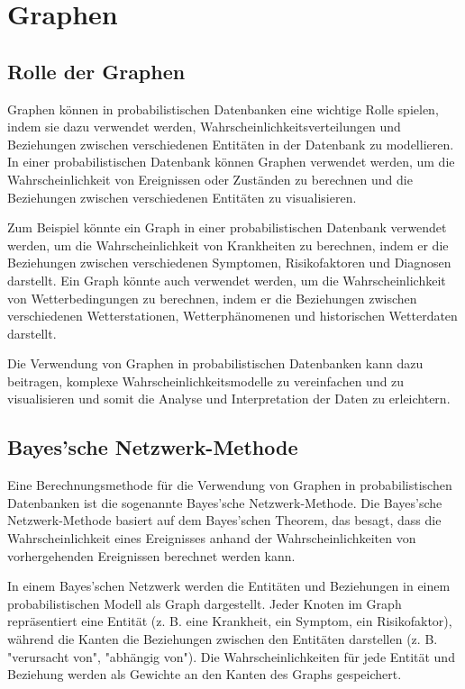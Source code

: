 \chapter{Graphen}
\section{Rolle der Graphen}
Graphen können in probabilistischen Datenbanken eine wichtige Rolle spielen, indem sie dazu verwendet werden, Wahrscheinlichkeitsverteilungen und Beziehungen zwischen verschiedenen Entitäten in der Datenbank zu modellieren. In einer probabilistischen Datenbank können Graphen verwendet werden, um die Wahrscheinlichkeit von Ereignissen oder Zuständen zu berechnen und die Beziehungen zwischen verschiedenen Entitäten zu visualisieren.

Zum Beispiel könnte ein Graph in einer probabilistischen Datenbank verwendet werden, um die Wahrscheinlichkeit von Krankheiten zu berechnen, indem er die Beziehungen zwischen verschiedenen Symptomen, Risikofaktoren und Diagnosen darstellt. Ein Graph könnte auch verwendet werden, um die Wahrscheinlichkeit von Wetterbedingungen zu berechnen, indem er die Beziehungen zwischen verschiedenen Wetterstationen, Wetterphänomenen und historischen Wetterdaten darstellt.


Die Verwendung von Graphen in probabilistischen Datenbanken kann dazu beitragen, komplexe Wahrscheinlichkeitsmodelle zu vereinfachen und zu visualisieren und somit die Analyse und Interpretation der Daten zu erleichtern.



\section{Bayes'sche Netzwerk-Methode}
Eine Berechnungsmethode für die Verwendung von Graphen in probabilistischen Datenbanken ist die sogenannte Bayes'sche Netzwerk-Methode. Die Bayes'sche Netzwerk-Methode basiert auf dem Bayes'schen Theorem, das besagt, dass die Wahrscheinlichkeit eines Ereignisses anhand der Wahrscheinlichkeiten von vorhergehenden Ereignissen berechnet werden kann.

In einem Bayes'schen Netzwerk werden die Entitäten und Beziehungen in einem probabilistischen Modell als Graph dargestellt. Jeder Knoten im Graph repräsentiert eine Entität (z. B. eine Krankheit, ein Symptom, ein Risikofaktor), während die Kanten die Beziehungen zwischen den Entitäten darstellen (z. B. "verursacht von", "abhängig von"). Die Wahrscheinlichkeiten für jede Entität und Beziehung werden als Gewichte an den Kanten des Graphs gespeichert.

